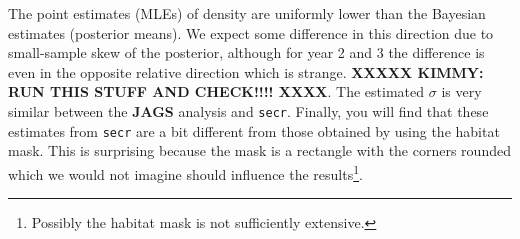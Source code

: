The point estimates (MLEs) of density are uniformly lower than the Bayesian estimates
(posterior means). We expect some difference in this direction due to
small-sample skew of the posterior, although for year 2 and 3 the
difference is even in the opposite relative direction which is
strange. {\bf XXXXX KIMMY: RUN THIS STUFF AND CHECK!!!! XXXX}.
The estimated $\sigma$ is very similar between the {\bf JAGS}
analysis and \mbox{\tt secr}.
Finally, you will find that these estimates from \mbox{\tt secr} 
 are a bit different from those obtained by
using the habitat mask. This is surprising because the mask 
is a rectangle with the corners
rounded which we would not imagine should influence the results\footnote{
Possibly the habitat mask is not sufficiently extensive.}. 

